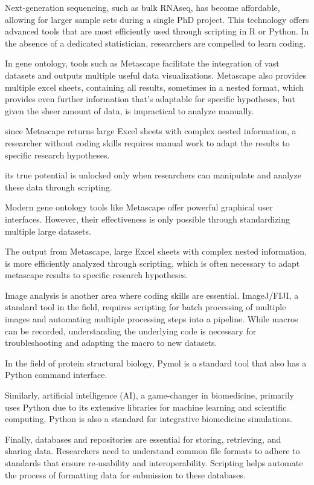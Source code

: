 Next-generation sequencing, such as bulk RNAseq, has become affordable, allowing
for larger sample sets during a single PhD project. This technology offers
advanced tools that are most efficiently used through scripting in R or Python.
In the absence of a dedicated statistician, researchers are compelled to learn
coding.

In gene ontology, tools such as Metascape facilitate the integration of vast
datasets and outputs multiple useful data visualizations. Metascape also
provides multiple excel sheets, containing all results, sometimes in a nested
format, which provides even further information that's adaptable for specific
hypotheses, but given the sheer amount of data, is impractical to analyze
manually.

since Metascape
returns large Excel sheets with complex nested information, a researcher without
coding skills requires manual work to adapt the results to specific research
hypotheses.

its true potential is unlocked only when researchers can
manipulate and analyze these data through scripting.

Modern gene ontology tools like Metascape offer powerful graphical user
interfaces. However, their effectiveness is only possible through standardizing
multiple large datasets.

The output from Metascape, large Excel sheets with
complex nested information, is more efficiently analyzed through scripting,
which is often necessary to adapt metascape results to specific research
hypotheses.



Image analysis is another area where coding skills are essential. ImageJ/FIJI, a
standard tool in the field, requires scripting for batch processing of multiple
images and automating multiple processing steps into a pipeline. While macros
can be recorded, understanding the underlying code is necessary for
troubleshooting and adapting the macro to new datasets.

In the field of protein structural biology, Pymol is a standard tool that also
has a Python command interface.

Similarly, artificial intelligence (AI), a
game-changer in biomedicine, primarily uses Python due to its extensive
libraries for machine learning and scientific computing. Python is also a
standard for integrative biomedicine simulations.

Finally, databases and repositories are essential for storing, retrieving, and
sharing data. Researchers need to understand common file formats to adhere to
standards that ensure re-usability and interoperability. Scripting helps
automate the process of formatting data for submission to these databases.

